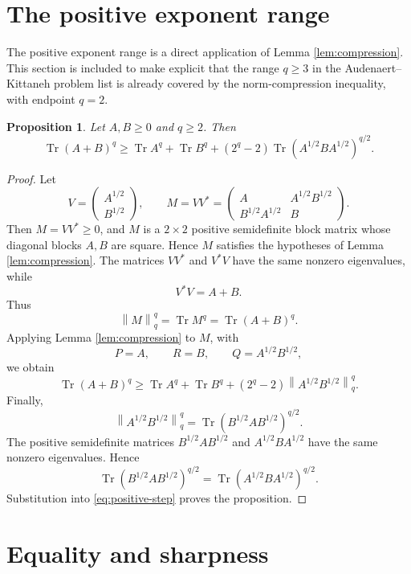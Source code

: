 \documentclass[11pt]{amsart}
\numberwithin{equation}{section}
\newtheorem{proposition}[theorem]{Proposition}
\newcommand{\Tr}{\operatorname{Tr}}
\newcommand{\norm}[1]{\left\lVert #1\right\rVert}
\begin{document}
\section{The positive exponent range}\label{sec:positive}

The positive exponent range is a direct application of Lemma \ref{lem:compression}.  This section is included to make explicit that the range \(q\ge 3\) in the Audenaert--Kittaneh problem list is already covered by the norm-compression inequality, with endpoint \(q=2\).

\begin{proposition}\label{prop:positive}
Let \(A,B\ge 0\) and \(q\ge 2\).  Then
\[
    \Tr(A+B)^q
    \ge
    \Tr A^q+\Tr B^q+
    (2^q-2)\Tr(A^{1/2}BA^{1/2})^{q/2}.
\]
\end{proposition}

\begin{proof}
Let
\[
    V=\begin{pmatrix}A^{1/2}\\ B^{1/2}\end{pmatrix},
    \qquad
    M=VV^*
    =
    \begin{pmatrix}
        A&A^{1/2}B^{1/2}\\
        B^{1/2}A^{1/2}&B
    \end{pmatrix}.
\]
Then \(M=VV^*\ge 0\), and \(M\) is a \(2\times2\) positive semidefinite block matrix whose diagonal blocks \(A,B\) are square.  Hence \(M\) satisfies the hypotheses of Lemma \ref{lem:compression}.  The matrices \(VV^*\) and \(V^*V\) have the same nonzero eigenvalues, while
\[
    V^*V=A+B.
\]
Thus
\begin{equation}\label{eq:V-spectrum}
    \norm{M}_q^q=\Tr M^q=\Tr(A+B)^q.
\end{equation}
Applying Lemma \ref{lem:compression} to \(M\), with
\[
    P=A,\qquad R=B,\qquad Q=A^{1/2}B^{1/2},
\]
we obtain
\begin{equation}\label{eq:positive-step}
    \Tr(A+B)^q
    \ge
    \Tr A^q+\Tr B^q+
    (2^q-2)\norm{A^{1/2}B^{1/2}}_q^q.
\end{equation}
Finally,
\[
    \norm{A^{1/2}B^{1/2}}_q^q
    =
    \Tr(B^{1/2}AB^{1/2})^{q/2}.
\]
The positive semidefinite matrices \(B^{1/2}AB^{1/2}\) and \(A^{1/2}BA^{1/2}\) have the same nonzero eigenvalues.  Hence
\[
    \Tr(B^{1/2}AB^{1/2})^{q/2}
    =
    \Tr(A^{1/2}BA^{1/2})^{q/2}.
\]
Substitution into \eqref{eq:positive-step} proves the proposition.
\end{proof}

\section{Equality and sharpness}\label{sec:sharpness}
\end{document}
